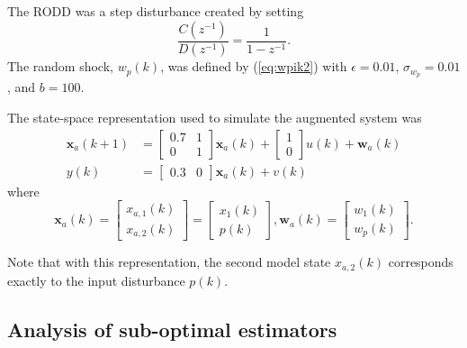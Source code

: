 The RODD was a step disturbance created by setting
\begin{equation}
	\frac{C(z^{-1})}{D(z^{-1})} = \frac{1}{1-z^{-1}}.
\end{equation}
The random shock, $w_p(k)$, was defined by (\ref{eq:wpik2}) with $\epsilon=0.01$, $\sigma_{w_p}=0.01$, and $b=100$.

The state-space representation used to simulate the augmented system was
\begin{equation} \label{eq:sim-sys-siso-ss-aug}
	\begin{split}
	\mathbf{x}_{a}(k+1) & =\left[\begin{array}{cc}
		0.7 & 1 \\
		0 & 1
	\end{array}\right] \mathbf{x}_{a}(k)+\left[\begin{array}{l}
		1 \\
		0
	\end{array}\right] u(k) + \mathbf{w}_{a}(k) \\
	y(k) & =\left[\begin{array}{cc}
	0.3 & 0
\end{array}\right] \mathbf{x}_{a}(k) + v(k)
\end{split}
\end{equation}
where
\begin{equation} \label{eq:sim-sys-siso-ss-aug2}
		\mathbf{x}_{a}(k) = \left[\begin{array}{l}
			x_{a,1}(k) \\
			x_{a,2}(k)
		\end{array}\right] = \left[\begin{array}{l}
		x_{1}(k) \\
		p(k)
	\end{array}\right], \mathbf{w}_{a}(k) = \left[\begin{array}{l}
	w_1(k) \\
	w_{p}(k)
\end{array}\right] .
\end{equation}

Note that with this representation, the second model state $x_{a,2}(k)$ corresponds exactly to the input disturbance $p(k)$.

\subsection{Analysis of sub-optimal estimators} \label{sim-obs-lin-1-SKF-analysis}

